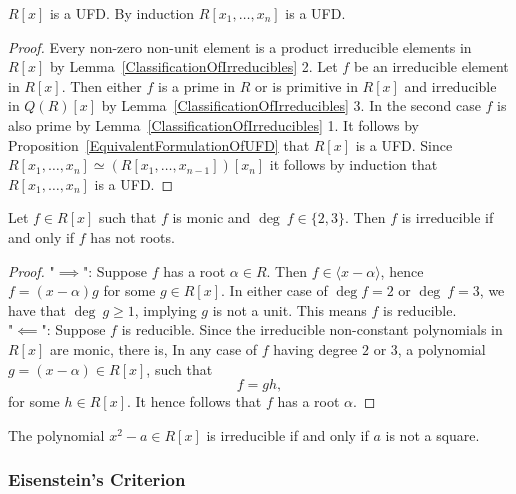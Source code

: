 \begin{theorem}
    $R[x]$ is a UFD. By induction $R[x_1,\dots,x_n]$ is a UFD.
\end{theorem}
\begin{proof}
    Every non-zero non-unit element is a product irreducible elements in $R[x]$ by Lemma~\ref{ClassificationOfIrreducibles} 2. Let $f$ be an irreducible element in $R[x]$. Then either $f$ is a prime in $R$ or is primitive in $R[x]$ and irreducible in $Q(R)[x]$ by Lemma~\ref{ClassificationOfIrreducibles} 3. In the second case $f$ is also prime by Lemma~\ref{ClassificationOfIrreducibles} 1. It follows by Proposition~\ref{EquivalentFormulationOfUFD} that $R[x]$ is a UFD. Since $R[x_1,\dots,x_{n}]\simeq (R[x_1,\dots,x_{n-1}])[x_n]$ it follows by induction that $R[x_1,\dots,x_n]$ is a UFD. 
\end{proof}
\begin{proposition}
    Let $f\in R[x]$ such that $f$ is monic and $\deg\ f \in\{2,3\}$. Then $f$ is irreducible if and only if $f$ has not roots. 
\end{proposition}
\begin{proof}
    "$\implies$": Suppose $f$ has a root $\alpha\in R$. Then $f\in \langle x-\alpha\rangle $, hence $f = (x-\alpha)g$ for some $g \in R[x]$. In either case of $\deg f = 2$ or $\deg \ f =3$, we have that $\deg \ g \geq 1$, implying $g$ is not a unit. This means $f$ is reducible.\\
    "$\impliedby$": Suppose $f$ is reducible. Since the irreducible non-constant polynomials in $R[x]$ are monic, there is, In any case of $f$ having degree $2$ or $3$, a polynomial $g = (x-\alpha)\in R[x]$, such that 
    $$f = gh,$$
    for some $h\in R[x]$. It hence follows that $f$ has a root $\alpha$.
\end{proof}
\begin{corollary}
    The polynomial $x^2-a\in R[x]$ is irreducible if and only if $a$ is not a square. 
\end{corollary}
\subsubsection{Eisenstein's Criterion}
